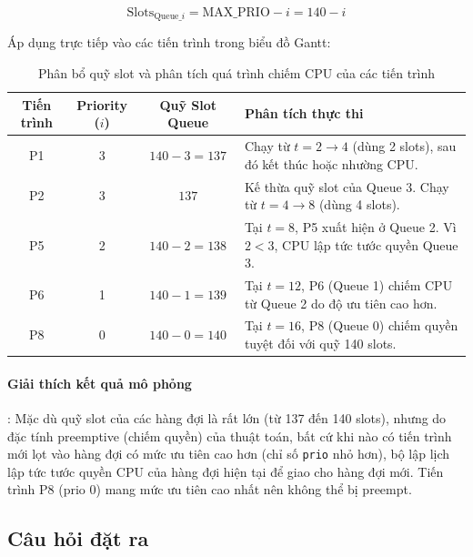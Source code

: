 \documentclass[a4paper]{article}
\begin{document}
$$\text{Slots}_{\text{Queue}\_i} = \text{MAX\_PRIO} - i = 140 - i$$

Áp dụng trực tiếp vào các tiến trình trong biểu đồ Gantt:
\begin{table}[H]
    \centering
    \begin{tabularx}{\textwidth}{|c|c|c|X|}
        \hline
        \textbf{Tiến trình} & \textbf{Priority ($i$)} & \textbf{Quỹ Slot Queue} & \textbf{Phân tích thực thi}                                                    \\ \hline
        P1                  & 3                       & $140 - 3 = 137$         & Chạy từ $t=2 \rightarrow 4$ (dùng 2 slots), sau đó kết thúc hoặc nhường CPU.   \\ \hline
        P2                  & 3                       & $137$                   & Kế thừa quỹ slot của Queue 3. Chạy từ $t=4 \rightarrow 8$ (dùng 4 slots).      \\ \hline
        P5                  & 2                       & $140 - 2 = 138$         & Tại $t=8$, P5 xuất hiện ở Queue 2. Vì $2 < 3$, CPU lập tức tước quyền Queue 3. \\ \hline
        P6                  & 1                       & $140 - 1 = 139$         & Tại $t=12$, P6 (Queue 1) chiếm CPU từ Queue 2 do độ ưu tiên cao hơn.           \\ \hline
        P8                  & 0                       & $140 - 0 = 140$         & Tại $t=16$, P8 (Queue 0) chiếm quyền tuyệt đối với quỹ 140 slots.              \\ \hline
    \end{tabularx}
    \caption{Phân bổ quỹ slot và phân tích quá trình chiếm CPU của các tiến trình}
\end{table}

\paragraph{Giải thích kết quả mô phỏng}: Mặc dù quỹ slot của các hàng đợi là rất lớn (từ 137 đến 140 slots), nhưng do đặc tính preemptive (chiếm quyền) của thuật toán, bất cứ khi nào có tiến trình mới lọt vào hàng đợi có mức ưu tiên cao hơn (chỉ số \texttt{prio} nhỏ hơn), bộ lập lịch lập tức tước quyền CPU của hàng đợi hiện tại để giao cho hàng đợi mới. Tiến trình P8 (prio 0) mang mức ưu tiên cao nhất nên không thể bị preempt.

\subsection{Câu hỏi đặt ra}
\end{document}
